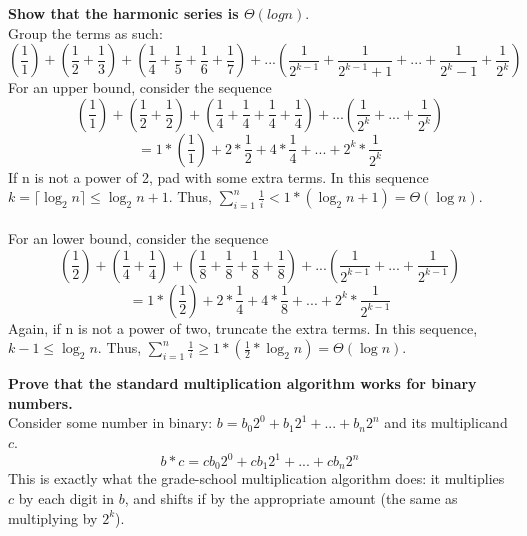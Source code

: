 \begin{problem}{1.5}
    \textbf{Show that the harmonic series is $\Theta(log n)$}.
    \\
    Group the terms as such:
    \[
        (\frac{1}{1}) + (\frac{1}{2} + \frac{1}{3}) + (\frac{1}{4} + \frac{1}{5} + \frac{1}{6} + \frac{1}{7}) + ... (\frac{1}{2^{k - 1}} + \frac{1}{2^{k - 1} + 1} + ... + \frac{1}{2^k - 1} + \frac{1}{2^k})
    \]
    For an upper bound, consider the sequence
    \[
         (\frac{1}{1}) + (\frac{1}{2} + \frac{1}{2}) + (\frac{1}{4} + \frac{1}{4} + \frac{1}{4} + \frac{1}{4}) + ... (\frac{1}{2^k} + ... + \frac{1}{2^k})
    \]
    \[
         = 1 * (\frac{1}{1}) + 2 * \frac{1}{2} + 4 * \frac{1}{4} + ... + 2^k * \frac{1}{2^k} 
    \]
    If n is not a power of 2, pad with some extra terms. In this sequence $k = \lceil \log_2n \rceil \leq \log_2n + 1$. Thus, $\sum_{i=1}^{n} \frac{1}{i} < 1 * (\log_2n + 1) = \Theta(\log n)$.
    \\ \\
     For an lower bound, consider the sequence
    \[
         (\frac{1}{2}) + (\frac{1}{4} + \frac{1}{4}) + (\frac{1}{8} + \frac{1}{8} + \frac{1}{8} + \frac{1}{8}) + ... (\frac{1}{2^{k - 1}} + ... + \frac{1}{2^{k - 1}})
    \]
    \[
         = 1 * (\frac{1}{2}) + 2 * \frac{1}{4} + 4 * \frac{1}{8} + ... + 2^k * \frac{1}{2^{k - 1}} 
    \]
    Again, if n is not a power of two, truncate the extra terms. In this sequence, $k - 1 \leq \log_2 n$. Thus, $\sum_{i=1}^{n} \frac{1}{i} \geq 1 * (\frac{1}{2} * \log_2n) = \Theta(\log n)$.
\end{problem}

\begin{problem}{1.6}
    \textbf{Prove that the standard multiplication algorithm works for binary numbers.}
    \\
    Consider some number in binary: $b = b_0 2^0 + b_1 2^1 + ... + b_n 2^n$ and its multiplicand $c$. 
    \[
         b * c = c b_0 2^0 + c b_1 2^1 + ... + c b_n 2^n
    \]
    This is exactly what the grade-school multiplication algorithm does: it multiplies $c$ by each digit in $b$, and shifts if by the appropriate amount (the same as multiplying by $2^k$).
\end{problem}

